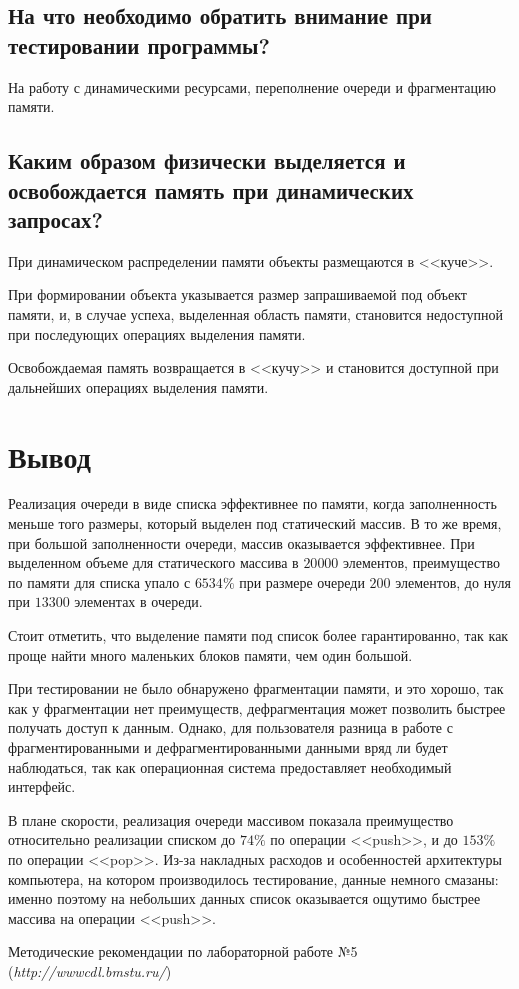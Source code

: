 \documentclass[a4paper,12pt]{extarticle}
\begin{document}
\subsection{На что необходимо обратить внимание при тестировании программы?}

На работу с динамическими ресурсами, переполнение очереди и фрагментацию памяти.

\subsection{Каким образом физически выделяется и освобождается память при динамических запросах?}

При динамическом распределении памяти объекты размещаются в <<куче>>.

При формировании объекта указывается размер запрашиваемой под объект памяти, и, в случае успеха, выделенная область памяти, становится недоступной при последующих операциях выделения памяти. 

Освобождаемая память возвращается в <<кучу>> и становится доступной при дальнейших операциях выделения памяти.

\newpage

\section{Вывод}

Реализация очереди в виде списка эффективнее по памяти, когда заполненность меньше того размеры, который выделен под статический массив. В то же время, при большой заполненности очереди, массив оказывается эффективнее. При выделенном объеме для статического массива в $20 000$ элементов, преимущество по памяти для списка упало с $6534 \%$ при размере очереди $200$ элементов, до нуля при $13 300$ элементах в очереди.

Стоит отметить, что выделение памяти под список более гарантированно, так как проще найти много маленьких блоков памяти, чем один большой.

При тестировании не было обнаружено фрагментации памяти, и это хорошо, так как у фрагментации нет преимуществ, дефрагментация может позволить быстрее получать доступ к данным. Однако, для пользователя разница в работе с фрагментированными и дефрагментированными данными вряд ли будет наблюдаться, так как операционная система предоставляет необходимый интерфейс.

В плане скорости, реализация очереди массивом показала преимущество относительно реализации списком до $74 \%$ по операции <<push>>, и до $153 \%$ по операции <<pop>>. Из-за накладных расходов и особенностей архитектуры компьютера, на котором производилось тестирование, данные немного смазаны: именно поэтому на небольших данных список оказывается ощутимо быстрее массива на операции <<push>>.

\newpage
\begin{thebibliography}{2}
Методические рекомендации по лабораторной работе №5 (\emph{http://wwwcdl.bmstu.ru/}) 
\end{thebibliography}
\end{document}

